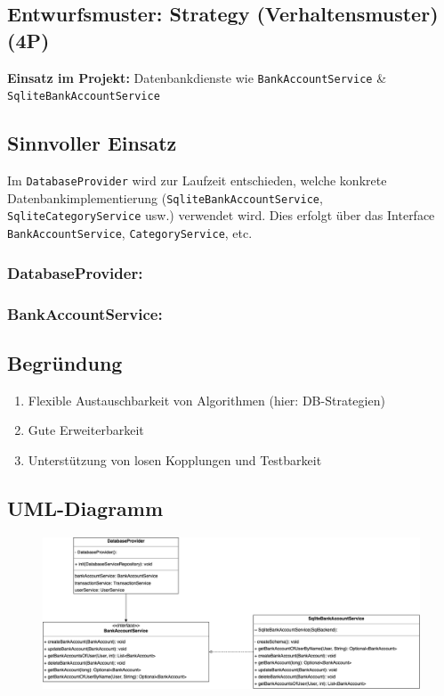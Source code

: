 \subsection{Entwurfsmuster: Strategy (Verhaltensmuster) (4P)}

\textbf{Einsatz im Projekt:} Datenbankdienste wie \texttt{BankAccountService} \& \texttt{SqliteBankAccountService}

\subsection*{Sinnvoller Einsatz}
Im \texttt{DatabaseProvider} wird zur Laufzeit entschieden, welche konkrete Datenbankimplementierung (\texttt{SqliteBankAccountService}, \texttt{SqliteCategoryService} usw.) verwendet wird. Dies erfolgt über das Interface \texttt{BankAccountService}, \texttt{CategoryService}, etc.

\subsubsection*{DatabaseProvider:}


\subsubsection*{BankAccountService:}



\subsection*{Begründung}
\begin{enumerate}
    \item Flexible Austauschbarkeit von Algorithmen (hier: DB-Strategien)
    \item Gute Erweiterbarkeit
    \item Unterstützung von losen Kopplungen und Testbarkeit
\end{enumerate}

\subsection*{UML-Diagramm}
\begin{figure}[htbp]
    \centering
    \includegraphics[width=\linewidth]
    {kapitel8_entwurfsmuster/UMLs/db.drawio1.png}
\end{figure}